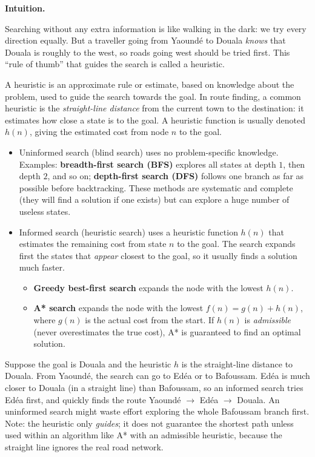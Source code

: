\documentclass[11pt]{article}
\newcommand{\cle}[1]{{\popxbold\color{popdark}#1}}
\newcounter{popsec}
\newcounter{popsub}
\newcommand{\courssub}[1]{%
  \stepcounter{popsub}%
  \par\vspace{9pt}\noindent{\popxbold\fontsize{11.5}{13}\selectfont\color{popink}{\color{poporange}\thepopsec.\thepopsub}\hspace{6pt}#1}\par\nopagebreak\vspace{4pt}
}
\begin{document}
\courssub{Uninformed and Informed (Heuristic) Search}

\textbf{Intuition.}\par
Searching without any extra information is like walking in the dark: we try every direction equally. But a traveller going from Yaoundé to Douala \emph{knows} that Douala is roughly to the west, so roads going west should be tried first. This ``rule of thumb'' that guides the search is called a \cle{heuristic}.

\begin{definition}[Heuristic]
A \cle{heuristic} is an approximate rule or estimate, based on knowledge about the problem, used to guide the search towards the goal. In route finding, a common heuristic is the \emph{straight-line distance} from the current town to the destination: it estimates how close a state is to the goal. A heuristic function is usually denoted $h(n)$, giving the estimated cost from node $n$ to the goal.
\end{definition}

\begin{itemize}
\item \cle{Uninformed search} (blind search) uses no problem-specific knowledge. Examples: \textbf{breadth-first search (BFS)} explores all states at depth $1$, then depth $2$, and so on; \textbf{depth-first search (DFS)} follows one branch as far as possible before backtracking. These methods are systematic and complete (they will find a solution if one exists) but can explore a huge number of useless states.
\item \cle{Informed search} (heuristic search) uses a heuristic function $h(n)$ that estimates the remaining cost from state $n$ to the goal. The search expands first the states that \emph{appear} closest to the goal, so it usually finds a solution much faster.
  \begin{itemize}
  \item \textbf{Greedy best-first search} expands the node with the lowest $h(n)$.
  \item \textbf{A* search} expands the node with the lowest $f(n) = g(n) + h(n)$, where $g(n)$ is the actual cost from the start. If $h(n)$ is \emph{admissible} (never overestimates the true cost), A* is guaranteed to find an optimal solution.
  \end{itemize}
\end{itemize}

\begin{exemplebox}
Suppose the goal is Douala and the heuristic $h$ is the straight-line distance to Douala. From Yaoundé, the search can go to Edéa or to Bafoussam. Edéa is much closer to Douala (in a straight line) than Bafoussam, so an informed search tries Edéa first, and quickly finds the route Yaoundé $\to$ Edéa $\to$ Douala. An uninformed search might waste effort exploring the whole Bafoussam branch first. Note: the heuristic only \emph{guides}; it does not guarantee the shortest path unless used within an algorithm like A* with an admissible heuristic, because the straight line ignores the real road network.
\end{exemplebox}
\end{document}
